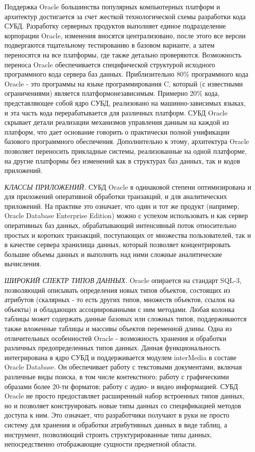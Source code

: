 Поддержка Oracle большинства популярных компьютерных платформ и архитектур достигается за счет жесткой технологической схемы разработки кода СУБД. Разработку серверных продуктов выполняет единое подразделение корпорации Oracle, изменения вносятся централизовано, после этого все версии подвергаются тщательному тестированию в базовом варианте, а затем переносятся на все платформы, где также детально проверяются. Возможность переноса Oracle обеспечивается специфической структурой исходного программного кода сервера баз данных. Приблизительно 80\% программного кода Oracle - это программы на языке программирования C, который (с известными ограничениями) является платформонезависимым. Примерно 20\% кода, представляющее собой ядро СУБД, реализовано на машинно-зависимых языках, и эта часть кода перерабатывается для различных платформ. СУБД Oracle скрывает детали реализации механизмов управления данным на каждой из платформ, что дает основание говорить о практически полной унификации базового программного обеспечения. Дополнительно к этому, архитектура Oracle позволяет переносить прикладные системы, реализованные на одной платформе, на другие платформы без изменений как в структурах баз данных, так и кодов приложений.

\textit{КЛАССЫ ПРИЛОЖЕНИЙ.}
СУБД Oracle в одинаковой степени оптимизирована и для приложений оперативной обработки транзакций, и для аналитических приложений. На практике это означает, что один и тот же продукт (например, Oracle Database Enterprise Edition) можно с успехом использовать и как сервер оперативных баз данных, обрабатывающий интенсивный поток относительно простых и коротких транзакций, поступающих от множества пользователей, так и в качестве сервера хранилища данных, который позволяет концентрировать большие объемы данных и выполнять над ними сложные аналитические вычисления.

\textit{ШИРОКИЙ СПЕКТР ТИПОВ ДАННЫХ.}
Oracle опирается на стандарт SQL-3, позволяющий описывать определения новых типов объектов, состоящих из атрибутов (скалярных - то есть других типов, множеств объектов, ссылок на объекты) и обладающих ассоциированными с ним методами. Любая колонка таблицы может содержать данные базовых или сложных типов, поддерживаются также вложенные таблицы и массивы объектов переменной длины.
Одна из отличительных особенностей Oracle - возможность хранения и обработки различных предопределенных типов данных. Данная функциональность интегрирована в ядро СУБД и поддерживается модулем interMedia в составе Oracle Database. Он обеспечивает работу с текстовыми документами, включая различные виды поиска, в том числе контекстного; работу с графическими образами более 20-ти форматов; работу с аудио- и видео информацией. СУБД Oracle не просто предоставляет расширенный набор встроенных типов данных, но и позволяет конструировать новые типы данных со спецификацией методов доступа к ним. Это означает, что разработчики получают в руки не просто систему для хранения и обработки атрибутивных данных в виде таблиц, а инструмент, позволяющий строить структурированные типы данных, непосредственно отображающие сущности предметной области.

